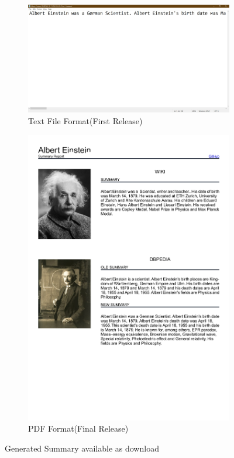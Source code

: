 \documentclass[head,11pt]{llncs}
\begin{document}
\begin{figure}[h!]
	\centering
	\begin{subfigure}{.6\textwidth}
		\centering
		\includegraphics[width=.8\linewidth]{figures/old text.jpeg}
		\caption{Text File Format(First Release)}
		\label{fig:sub1}
	\end{subfigure}%
	\begin{subfigure}{.4\textwidth}
		\centering
		\includegraphics[width=.8\linewidth]{figures/albert.jpg}
		\caption{PDF Format(Final Release)}
		\label{fig:sub2}
	\end{subfigure}
	\caption{Generated Summary available as download}
	\label{fig:file}
\end{figure}
\end{document}
